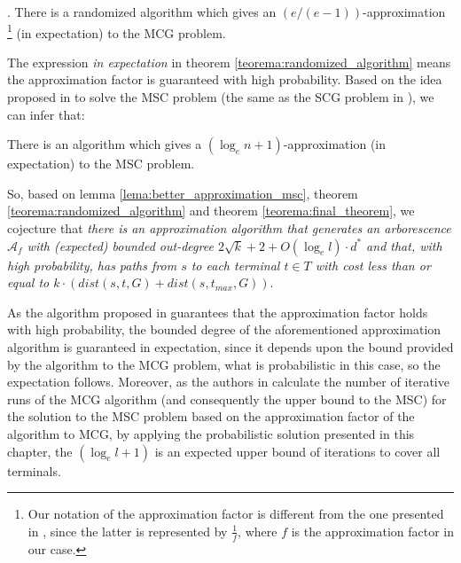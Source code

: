 \begin{Theo}
  \label{teorema:randomized_algorithm}
  \cite{Calinescu2011}. There is a randomized algorithm which gives an $(e/(e-1))$-approximation
\footnote{Our notation of the approximation factor is different from the one presented in \cite{Calinescu2011}, since the latter is represented by $\frac{1}{f}$, 
where $f$ is the approximation factor in our case.}
(in expectation) to the MCG problem.
\end{Theo}

The expression \emph{in expectation} in theorem \ref{teorema:randomized_algorithm} means the approximation factor is guaranteed with high probability. 
Based on the idea proposed in \cite{Chekuri2004} to solve the MSC problem (the same as the SCG problem in \cite{Chekuri2004}), we can infer that:

\begin{Lem}
  \label{lema:better_approximation_msc}
  There is an algorithm which gives a $(\log_{e} n + 1)$-approximation (in expectation) to the MSC problem.
\end{Lem}

So, based on lemma \ref{lema:better_approximation_msc}, theorem \ref{teorema:randomized_algorithm} and theorem \ref{teorema:final_theorem}, we cojecture that %
\emph{there is an approximation algorithm that generates an arborescence $\mathcal{A}_f$ with (expected) bounded out-degree 
$2\sqrt{k} + 2 + O(\log_{e} l) \cdot d^*$  
and that, with high probability, has paths from $s$ to each terminal $t \in T$ with cost less than or equal to $k \cdot ( dist(s,t,G) + dist(s,t_{max},G))$}.

As the algorithm proposed in \cite{Calinescu2011} guarantees that the approximation factor holds with high probability, the bounded degree of the aforementioned approximation algorithm is guaranteed in expectation, 
since it depends upon the bound provided by the algorithm to the MCG problem, what is probabilistic in this case, so the expectation follows. Moreover, 
as the authors in \cite{Chekuri2004} calculate the number of iterative runs of the MCG algorithm (and consequently the upper bound to the MSC) for the solution to the MSC problem 
based on the approximation factor of the algorithm to MCG,  
by applying the probabilistic solution presented in this chapter, the $(\log_{e} l + 1)$ is an expected upper bound of iterations to cover all terminals.

